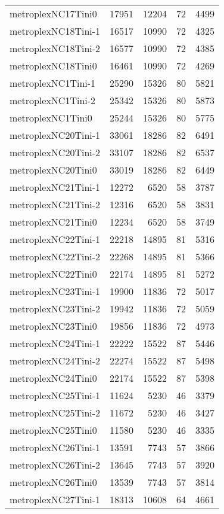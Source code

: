 \begin{tabular}{lrrrr}
metroplexNC17Tini0 & 17951 & 12204 & 72 & 4499 \\
metroplexNC18Tini-1 & 16517 & 10990 & 72 & 4325 \\
metroplexNC18Tini-2 & 16577 & 10990 & 72 & 4385 \\
metroplexNC18Tini0 & 16461 & 10990 & 72 & 4269 \\
metroplexNC1Tini-1 & 25290 & 15326 & 80 & 5821 \\
metroplexNC1Tini-2 & 25342 & 15326 & 80 & 5873 \\
metroplexNC1Tini0 & 25244 & 15326 & 80 & 5775 \\
metroplexNC20Tini-1 & 33061 & 18286 & 82 & 6491 \\
metroplexNC20Tini-2 & 33107 & 18286 & 82 & 6537 \\
metroplexNC20Tini0 & 33019 & 18286 & 82 & 6449 \\
metroplexNC21Tini-1 & 12272 & 6520 & 58 & 3787 \\
metroplexNC21Tini-2 & 12316 & 6520 & 58 & 3831 \\
metroplexNC21Tini0 & 12234 & 6520 & 58 & 3749 \\
metroplexNC22Tini-1 & 22218 & 14895 & 81 & 5316 \\
metroplexNC22Tini-2 & 22268 & 14895 & 81 & 5366 \\
metroplexNC22Tini0 & 22174 & 14895 & 81 & 5272 \\
metroplexNC23Tini-1 & 19900 & 11836 & 72 & 5017 \\
metroplexNC23Tini-2 & 19942 & 11836 & 72 & 5059 \\
metroplexNC23Tini0 & 19856 & 11836 & 72 & 4973 \\
metroplexNC24Tini-1 & 22222 & 15522 & 87 & 5446 \\
metroplexNC24Tini-2 & 22274 & 15522 & 87 & 5498 \\
metroplexNC24Tini0 & 22174 & 15522 & 87 & 5398 \\
metroplexNC25Tini-1 & 11624 & 5230 & 46 & 3379 \\
metroplexNC25Tini-2 & 11672 & 5230 & 46 & 3427 \\
metroplexNC25Tini0 & 11580 & 5230 & 46 & 3335 \\
metroplexNC26Tini-1 & 13591 & 7743 & 57 & 3866 \\
metroplexNC26Tini-2 & 13645 & 7743 & 57 & 3920 \\
metroplexNC26Tini0 & 13539 & 7743 & 57 & 3814 \\
metroplexNC27Tini-1 & 18313 & 10608 & 64 & 4661 \\

\end{tabular}
